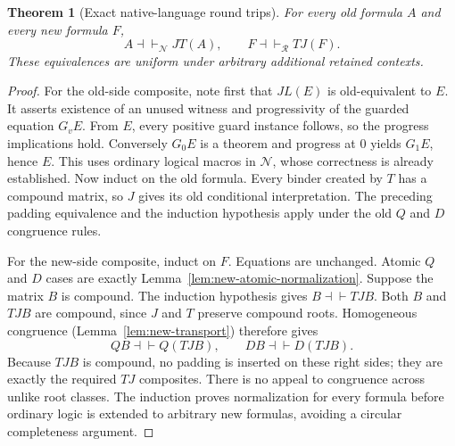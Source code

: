 \documentclass[11pt,a4paper]{article}
\newtheorem{theorem}{Theorem}[section]
\theoremstyle{definition}
\begin{document}
\begin{theorem}[Exact native-language round trips]
\label{thm:new-roundtrips}
For every old formula $A$ and every new formula $F$,
\begin{equation}
 A\dashv\vdash_{\mathcal N}JT(A),\qquad
 F\dashv\vdash_{\mathcal R}TJ(F).
 \label{eq:new-roundtrips}
\end{equation}
These equivalences are uniform under arbitrary additional retained contexts.
\end{theorem}
\begin{proof}
For the old-side composite, note first that $JL(E)$ is old-equivalent to
$E$.  It asserts existence of an unused witness and progressivity of the
guarded equation $G_vE$.  From $E$, every positive guard instance follows,
so the progress implications hold.  Conversely $G_0E$ is a theorem and
progress at $0$ yields $G_1E$, hence $E$.  This uses ordinary logical
macros in $\mathcal N$, whose correctness is already established.
Now induct on the old formula.  Every binder created by $T$ has a compound
matrix, so $J$ gives its old conditional interpretation.  The preceding
padding equivalence and the induction hypothesis apply under the old
$Q$ and $D$ congruence rules.

For the new-side composite, induct on $F$.  Equations are unchanged.
Atomic $Q$ and $D$ cases are exactly
Lemma~\ref{lem:new-atomic-normalization}.  Suppose the matrix $B$ is
compound.  The induction hypothesis gives $B\dashv\vdash TJB$.
Both $B$ and $TJB$ are compound, since $J$ and $T$ preserve compound roots.
Homogeneous congruence (Lemma~\ref{lem:new-transport}) therefore gives
\[
 Q B\dashv\vdash Q(TJB),\qquad
 D B\dashv\vdash D(TJB).
\]
Because $TJB$ is compound, no padding is inserted on these right sides;
they are exactly the required $TJ$ composites.  There is no appeal to
congruence across unlike root classes.  The induction proves normalization
for every formula before ordinary logic is extended to arbitrary new
formulas, avoiding a circular completeness argument.
\end{proof}
\end{document}
